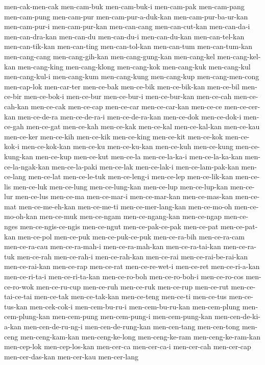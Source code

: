 {men-cak-men-cak men-cam-buk men-cam-buk-i men-cam-pak men-cam-pang
men-cam-pung men-cam-pur men-cam-pur-a-duk-kan men-cam-pur-ba-ur-kan
men-cam-pur-i men-cam-pur-kan men-can-cang men-can-cut-kan men-can-da-i
men-can-dra-kan men-can-du men-can-du-i men-can-du-kan men-can-tel-kan
men-can-tik-kan men-can-ting men-can-tol-kan men-can-tum men-can-tum-kan
men-cang-cang men-cang-gih-kan men-cang-gung-kan men-cang-kel
men-cang-kel-kan men-cang-king men-cang-klong men-cang-kok men-cang-kuk
men-cang-kul men-cang-kul-i men-cang-kum men-cang-kung men-cang-kup
men-cang-men-cong men-cap-lok men-car-ter men-ce-bak men-ce-bik
men-ce-bik-kan men-ce-bil men-ce-bir men-ce-bok-i men-ce-bur men-ce-bur-i
men-ce-bur-kan men-ce-cah men-ce-cah-kan men-ce-cak men-ce-cap men-ce-car
men-ce-car-kan men-ce-ce men-ce-cer-kan men-ce-de-ra men-ce-de-ra-i
men-ce-de-ra-kan men-ce-dok men-ce-dok-i men-ce-gah men-ce-gat men-ce-kah
men-ce-kak men-ce-kal men-ce-kal-kan men-ce-kau men-ce-ker men-ce-kih
men-ce-kik men-ce-king men-ce-kit men-ce-kok men-ce-kok-i men-ce-kok-kan
men-ce-ku men-ce-ku-kan men-ce-kuh men-ce-kung men-ce-kung-kan men-ce-kup
men-ce-kut men-ce-la men-ce-la-ka-i men-ce-la-ka-kan men-ce-la-ngak-kan
men-ce-la-paki men-ce-lak men-ce-lak-i men-ce-lam-pak-kan men-ce-lang
men-ce-lat men-ce-le-tuk men-ce-leng-i men-ce-lep men-ce-lik-kan
men-ce-lis men-ce-luk men-ce-lung men-ce-lung-kan men-ce-lup
men-ce-lup-kan men-ce-lur men-ce-lus men-ce-ma men-ce-mar-i men-ce-mar-kan
men-ce-mas-kan men-ce-mat men-ce-me-eh-kan men-ce-me-ti
men-ce-mer-lang-kan men-ce-mo-oh men-ce-mo-oh-kan men-ce-muk men-ce-ngam
men-ce-ngang-kan men-ce-ngap men-ce-nges men-ce-ngis-ce-ngis men-ce-ngut
men-ce-pak-ce-pak men-ce-pat men-ce-pat-kan men-ce-pol men-ce-puk
men-ce-puk-ce-puk men-ce-ra-bih men-ce-ra-cam men-ce-ra-cau
men-ce-ra-mah-i men-ce-ra-mah-kan men-ce-ra-tai-kan men-ce-ra-tuk
men-ce-rah men-ce-rah-i men-ce-rah-kan men-ce-rai men-ce-rai-be-rai-kan
men-ce-rai-kan men-ce-rap men-ce-rat men-ce-re-wet-i men-ce-ret
men-ce-ri-a-kan men-ce-ri-ta-i men-ce-ri-ta-kan men-ce-ro-boh
men-ce-ro-boh-i men-ce-ro-cos men-ce-ro-wok men-ce-ru-cup men-ce-ruh
men-ce-ruk men-ce-rup men-ce-rut men-ce-tai-ce-tai men-ce-tak
men-ce-tak-kan men-ce-teng men-ce-ti men-ce-tus men-ce-tus-kan
men-cek-cok-i men-cem-bu-ru-i men-cem-bu-ru-kan men-cem-plung
men-cem-plung-kan men-cem-pung men-cem-pung-i men-cem-pung-kan
men-cen-de-ki-a-kan men-cen-de-ru-ng-i men-cen-de-rung-kan men-cen-tang
men-cen-tong men-ceng men-ceng-kam-kan men-ceng-ke-long men-ceng-ke-ram
men-ceng-ke-ram-kan men-cep-lok men-cep-los-kan men-cer-ca men-cer-ca-i
men-cer-cah men-cer-cap men-cer-das-kan men-cer-kau men-cer-lang
}
